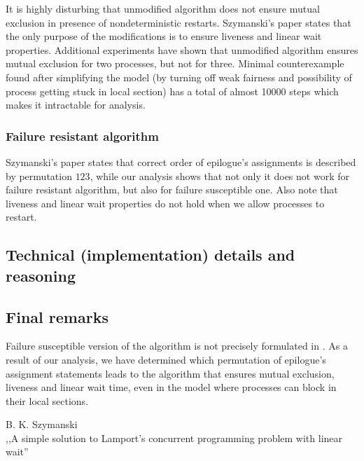 It is highly disturbing that unmodified algorithm does not ensure mutual exclusion in presence of nondeterministic restarts.
Szymanski's paper \cite{Original} states that the only purpose of the modifications is to ensure liveness and linear wait properties.
Additional experiments have shown that unmodified algorithm ensures mutual exclusion for two processes, but not for three.
Minimal counterexample found after simplifying the model (by turning off weak fairness and possibility of process getting stuck in local section) has a total of almost 10000 steps which makes it intractable for analysis.

\subsubsection*{Failure resistant algorithm}

Szymanski's paper \cite{Original} states that correct order of epilogue's assignments is described by permutation $123$, while our analysis shows that not only it does not work for failure resistant algorithm, but also for failure susceptible one.
Also note that liveness and linear wait properties do not hold when we allow processes to restart.


\subsection*{Technical (implementation) details and reasoning}


\subsection*{Final remarks}

Failure susceptible version of the algorithm is not precisely formulated in \cite{Original}.
As a result of our analysis, we have determined which permutation of epilogue's assignment statements leads to the algorithm that ensures mutual exclusion, liveness and linear wait time, even in the model where processes can block in their local sections.


\begin{thebibliography}{9}
   B. K. Szymanski \\
    \newblock ,,A simple solution to Lamport's concurrent programming problem with linear wait''
\end{thebibliography}


